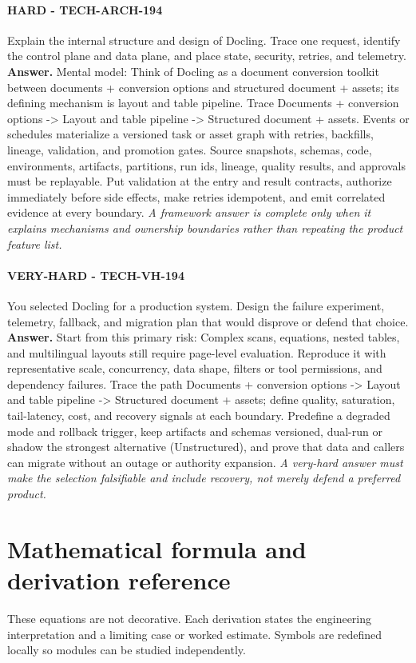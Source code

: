 \paragraph{HARD - TECH-ARCH-194} Explain the internal structure and design of Docling. Trace one request, identify the control plane and data plane, and place state, security, retries, and telemetry.
\textbf{Answer.} Mental model: Think of Docling as a document conversion toolkit between documents + conversion options and structured document + assets; its defining mechanism is layout and table pipeline. Trace Documents + conversion options -> Layout and table pipeline -> Structured document + assets. Events or schedules materialize a versioned task or asset graph with retries, backfills, lineage, validation, and promotion gates. Source snapshots, schemas, code, environments, artifacts, partitions, run ids, lineage, quality results, and approvals must be replayable. Put validation at the entry and result contracts, authorize immediately before side effects, make retries idempotent, and emit correlated evidence at every boundary.
\textit{A framework answer is complete only when it explains mechanisms and ownership boundaries rather than repeating the product feature list.}
\paragraph{VERY-HARD - TECH-VH-194} You selected Docling for a production system. Design the failure experiment, telemetry, fallback, and migration plan that would disprove or defend that choice.
\textbf{Answer.} Start from this primary risk: Complex scans, equations, nested tables, and multilingual layouts still require page-level evaluation. Reproduce it with representative scale, concurrency, data shape, filters or tool permissions, and dependency failures. Trace the path Documents + conversion options -> Layout and table pipeline -> Structured document + assets; define quality, saturation, tail-latency, cost, and recovery signals at each boundary. Predefine a degraded mode and rollback trigger, keep artifacts and schemas versioned, dual-run or shadow the strongest alternative (Unstructured), and prove that data and callers can migrate without an outage or authority expansion.
\textit{A very-hard answer must make the selection falsifiable and include recovery, not merely defend a preferred product.}
\clearpage\section{Mathematical formula and derivation reference}
These equations are not decorative. Each derivation states the engineering interpretation and a limiting case or worked estimate. Symbols are redefined locally so modules can be studied independently.
